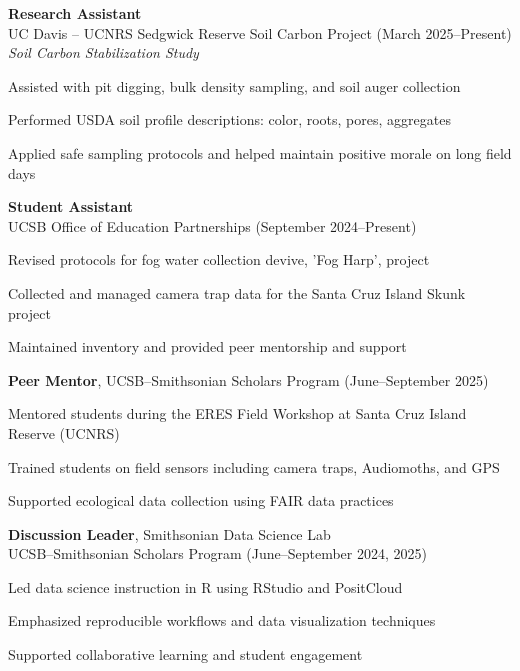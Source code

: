 \documentclass[letterpaper]{article}
\renewenvironment{itemize}{
  \begin{list}{}{
    \setlength{\leftmargin}{1.5em}
  }
}{
  \end{list}
}
\begin{document}
\item \textbf{Research Assistant} \\ 
UC Davis – UCNRS Sedgwick Reserve Soil Carbon Project (March 2025–Present) \\
\emph{Soil Carbon Stabilization Study}
\begin{itemize}
  \item Assisted with pit digging, bulk density sampling, and soil auger collection
  \item Performed USDA soil profile descriptions: color, roots, pores, aggregates
  \item Applied safe sampling protocols and helped maintain positive morale on long field days
\end{itemize}

\item \textbf{Student Assistant} \\
UCSB Office of Education Partnerships (September 2024–Present)  
\begin{itemize}
  \item Revised protocols for fog water collection devive, 'Fog Harp', project
  \item Collected and managed camera trap data for the Santa Cruz Island Skunk project
  \item Maintained inventory and provided peer mentorship and support
\end{itemize}

\item \textbf{Peer Mentor}, UCSB–Smithsonian Scholars Program (June–September 2025)   
\begin{itemize}
  \item Mentored students during the ERES Field Workshop at Santa Cruz Island Reserve (UCNRS)
  \item Trained students on field sensors including camera traps, Audiomoths, and GPS
  \item Supported ecological data collection using FAIR data practices
\end{itemize}

\item \textbf{Discussion Leader}, Smithsonian Data Science Lab \\
UCSB–Smithsonian Scholars Program (June–September 2024, 2025) 
\begin{itemize}
  \item Led data science instruction in R using RStudio and PositCloud
  \item Emphasized reproducible workflows and data visualization techniques
  \item Supported collaborative learning and student engagement
\end{itemize}
\end{document}

